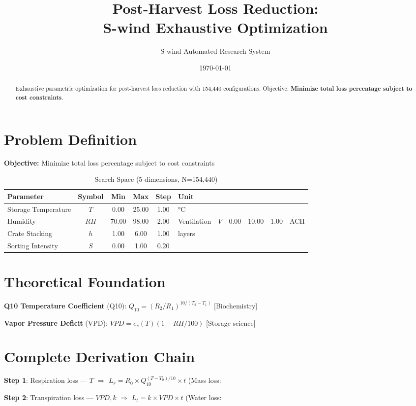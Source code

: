 \documentclass[11pt,twocolumn]{article}
\title{Post-Harvest Loss Reduction: \\S-wind Exhaustive Optimization}
\author{S-wind Automated Research System}
\date{\today}
\begin{document}
\maketitle

\begin{abstract}
Exhaustive parametric optimization for post-harvest loss reduction with 154,440 configurations.
Objective: \textbf{Minimize total loss percentage subject to cost constraints}.
\end{abstract}

\section{Problem Definition}
\textbf{Objective:} Minimize total loss percentage subject to cost constraints

\begin{table}[h]
\centering
\caption{Search Space (5 dimensions, N=154,440)}
\begin{tabular}{@{}lccccl@{}}
\toprule
Parameter & Symbol & Min & Max & Step & Unit \\
\midrule
Storage Temperature & $T$ & 0.00 & 25.00 & 1.00 & °C \\
Humidity & $RH$ & 70.00 & 98.00 & 2.00 & %
Ventilation & $V$ & 0.00 & 10.00 & 1.00 & ACH \\
Crate Stacking & $h$ & 1.00 & 6.00 & 1.00 & layers \\
Sorting Intensity & $S$ & 0.00 & 1.00 & 0.20 &  \\
\bottomrule
\end{tabular}
\end{table}

\section{Theoretical Foundation}
\textbf{Q10 Temperature Coefficient} (Q10): $Q_{10} = (R_2/R_1)^{10/(T_2-T_1)}$ [Biochemistry]

\textbf{Vapor Pressure Deficit} (VPD): $VPD = e_s(T)(1-RH/100)$ [Storage science]


\section{Complete Derivation Chain}
\textbf{Step 1}: Respiration loss --- $T$ $\Rightarrow$ $L_r = R_0 \times Q_{10}^{(T-T_0)/10} \times t$ (Mass loss: %


\textbf{Step 2}: Transpiration loss --- $VPD, k$ $\Rightarrow$ $L_t = k \times VPD \times t$ (Water loss: %
\end{document}
